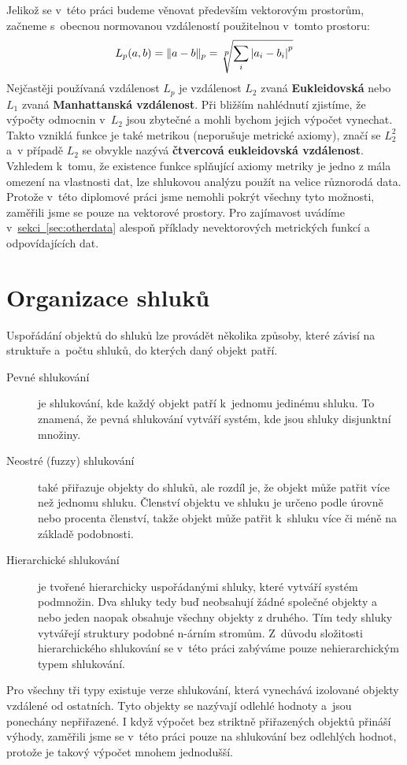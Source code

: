 Jelikož se v~této práci budeme věnovat především vektorovým prostorům, začneme s~obecnou normovanou vzdáleností použitelnou v~tomto prostoru:
$$L_p(a, b)=\|a-b\|_p=\sqrt[\leftroot{-1}\uproot{3}\scriptstyle p]{\sum_i |a_i - b_i|\strut^p} $$
Nejčastěji používaná vzdálenost $L_p$ je vzdálenost $L_2$ zvaná \textbf {Eukleidovská} nebo $L_1$ zvaná \textbf {Manhattanská vzdá\-le\-nost}.
Při bližším nahlédnutí zjistíme, že výpočty odmocnin v~$L_2$ jsou zbytečné a mohli bychom jejich výpočet vynechat. Takto vzniklá funkce je také metrikou (neporušuje metrické axiomy), značí se $L_2^2$  a~v případě $L_2$ se obvykle nazývá \textbf {čtvercová eukleidovská vzdálenost}.\\

Vzhledem k~tomu, že existence funkce splňující axiomy metriky je jedno z mála omezení na vlastnosti dat, lze shlukovou analýzu použít na velice různorodá data. Protože v~této diplomové práci jsme nemohli pokrýt všechny tyto možnosti, zaměřili jsme se pouze na vektorové prostory. Pro zajímavost uvádíme v~\hyperref[sec:otherdata]{sekci~\ref*{sec:otherdata}} alespoň příklady nevektorových metrických funkcí a odpovídajících dat.

\section{Organizace shluků} \label{sec:clusterorganization}
Uspořádání objektů do shluků lze provádět několika způsoby, které závisí na struktuře a~počtu shluků, do kterých daný objekt patří.
\begin{description}
\item[Pevné shlukování] je shlukování, kde každý objekt patří k~jednomu jedinému shluku. To znamená, že pevná shlukování vytváří systém, kde jsou shluky disjunktní množiny.
\item[Neostré (fuzzy) shlukování] také přiřazuje objekty do shluků, ale rozdíl je, že objekt může patřit více než jednomu shluku. Členství objektu ve shluku je určeno podle úrovně nebo procenta členství, takže objekt může patřit k~shluku více či méně na základě podobnosti.
\item[Hierarchické shlukování] je tvořené hierarchicky uspořádanými shluky, které vytváří systém podmnožin. Dva shluky tedy buď neobsahují žádné společné objekty a nebo jeden naopak obsahuje všechny objekty z druhého. Tím tedy shluky vytvářejí struktury podobné n-árním stromům. Z~důvodu složitosti hierarchického shlukování se v~této práci zabýváme pouze nehierarchickým typem shlukování.
\end{description}
Pro všechny tři typy existuje verze shlukování, která vynechává izolované objekty vzdálené od ostatních. Tyto objekty se nazývají odlehlé hodnoty a~jsou ponechány nepřiřazené. I když výpočet bez striktně přiřazených objektů přináší výhody, zaměřili jsme se v~této práci pouze na shlukování bez odlehlých hodnot, protože je takový výpočet mnohem jednodušší.\\

